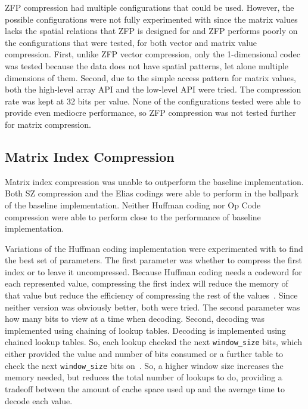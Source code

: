 ZFP compression had multiple configurations that could be used.
However, the possible configurations were not fully experimented with since the matrix values lacks the spatial relations that ZFP is designed for and ZFP performs poorly on the configurations that were tested, for both vector and matrix value compression.
First, unlike ZFP vector compression, only the 1-dimensional codec was tested because the data does not have spatial patterns, let alone multiple dimensions of them.
Second, due to the simple access pattern for matrix values, both the high-level array API and the low-level API were tried.
The compression rate was kept at 32 bits per value.
None of the configurations tested were able to provide even mediocre performance, so ZFP compression was not tested further for matrix compression.

\subsection{Matrix Index Compression}
\label{sec:results-inds}
Matrix index compression was unable to outperform the baseline implementation.
Both SZ compression and the Elias codings were able to perform in the ballpark of the baseline implementation.
Neither Huffman coding nor Op Code compression were able to perform close to the performance of baseline implementation.


Variations of the Huffman coding implementation were experimented with to find the best set of parameters.
The first parameter was whether to compress the first index or to leave it uncompressed.
Because Huffman coding needs a codeword for each represented value, compressing the first index will reduce the memory of that value but reduce the efficiency of compressing the rest of the values~\cite{Huffman:1952:coding}.
Since neither version was obviously better, both were tried.
The second parameter was how many bits to view at a time when decoding.
Second, decoding was implemented using chaining of lookup tables.
Decoding is implemented using chained lookup tables.
So, each lookup checked the next \texttt{window\_size} bits, which either provided the value and number of bits consumed or a further table to check the next \texttt{window\_size} bits on~\cite{Schindler:1998:huffman-decode}.
So, a higher window size increases the memory needed, but reduces the total number of lookups to do, providing a tradeoff between the amount of cache space used up and the average time to decode each value.

